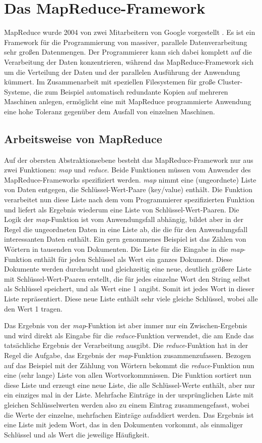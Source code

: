 \section{Das MapReduce-Framework}
MapReduce wurde 2004 von zwei Mitarbeitern von Google vorgestellt \cite{dean2008mapreduce}. Es ist ein Framework
für die Programmierung von massiver, parallele Datenverarbeitung sehr großen Datenmengen. Der Programmierer
kann sich dabei komplett auf die Verarbeitung der Daten konzentrieren, während das MapReduce-Framework sich um die
Verteilung der Daten und der parallelen Ausführung der Anwendung kümmert. Im Zusammenarbeit mit speziellen Filesystemen 
für große Cluster-Systeme, die zum Beispiel automatisch redundante Kopien auf mehreren Maschinen anlegen, ermöglicht
eine mit MapReduce programmierte Anwendung eine hohe Toleranz gegenüber dem Ausfall von einzelnen Maschinen.

\subsection{Arbeitsweise von MapReduce}
Auf der obersten Abstraktionsebene besteht das MapReduce-Framework nur aus zwei Funktionen: \textit{map} und \textit{reduce}.
Beide Funktionen müssen vom Anwender des MapReduce-Frameworks spezifiziert werden.
\textit{map} nimmt eine (ungeordnete) Liste von Daten entgegen, die Schlüssel-Wert-Paare (key/value) enthält. Die Funktion 
verarbeitet nun diese Liste nach dem vom Programmierer spezifizierten Funktion und liefert als Ergebnis wiederum eine
Liste von Schlüssel-Wert-Paaren. Die Logik der \textit{map}-Funktion ist vom Anwendungsfall abhängig, bildet aber in der Regel
die ungeordneten Daten in eine Liste ab, die die für den Anwendungsfall interessanten Daten enthält. Ein gern genommenes Beispiel
ist das Zählen von Wörtern in tausenden von Dokumenten. Die Liste für die Eingabe in die \textit{map}-Funktion enthält für jeden Schlüssel
als Wert ein ganzes Dokument. Diese Dokumente werden durchsucht und gleichzeitig eine neue, deutlich größere Liste mit Schlüssel-Wert-Paaren erstellt, 
die für jedes einzelne Wort den String selbst als Schlüssel speichert, und als Wert eine 1 angibt. Somit ist jedes Wort in dieser Liste repräsentiert.
Diese neue Liste enthält sehr viele gleiche Schlüssel, wobei alle den Wert 1 tragen.

Das Ergebnis von der \textit{map}-Funktion ist aber immer nur ein Zwischen-Ergebnis und wird direkt als Eingabe für die \textit{reduce}-Funktion verwendet,
die am Ende das tatsächliche Ergebnis der Verarbeitung ausgibt. Die \textit{reduce}-Funktion hat in der Regel die Aufgabe, das Ergebnis der \textit{map}-Funktion
zusammenzufassen. Bezogen auf das Beispiel mit der Zählung von Wörtern bekommt die \textit{reduce}-Funktion nun eine (sehr lange) Liste von allen Wortvorkommnissen.
Die Funktion sortiert  nun diese Liste und erzeugt eine neue Liste, die alle Schlüssel-Werte enthält, aber nur ein einziges mal in der Liste. Mehrfache Einträge
in der ursprünglichen Liste mit gleichen Schlüsselwerten werden also zu einem Eintrag zusammengefasst, wobei die Werte der einzelne, mehrfachen Einträge
aufaddiert werden. Das Ergebnis ist eine Liste mit jedem Wort, das in den Dokumenten vorkommt, als einmaliger Schlüssel und als Wert die jeweilige Häufigkeit.


